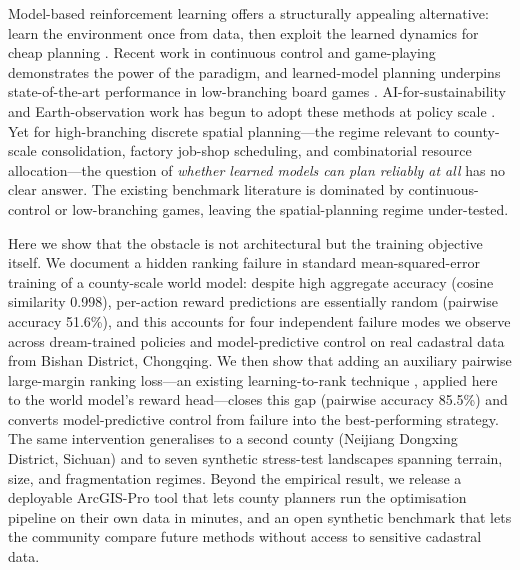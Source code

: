 \documentclass[11pt]{article}
\begin{document}
Model-based reinforcement learning offers a structurally appealing alternative: learn the environment once from data, then exploit the learned dynamics for cheap planning \citep{chua2018deep,janner2019trust,nagabandi2018neural,kurutach2018model}. Recent work in continuous control \citep{hafner2025dreamerv3,hansen2024tdmpc2,hafner2019learning} and game-playing \citep{mnih2015human,silver2017mastering,vinyals2019grandmaster,wurman2022outracing} demonstrates the power of the paradigm, and learned-model planning underpins state-of-the-art performance in low-branching board games \citep{schrittwieser2020muzero}. AI-for-sustainability and Earth-observation work has begun to adopt these methods at policy scale \citep{rolnick2022tackling,reichstein2019deep,tuia2024artificial}. Yet for high-branching discrete spatial planning---the regime relevant to county-scale consolidation, factory job-shop scheduling, and combinatorial resource allocation---the question of \emph{whether learned models can plan reliably at all} has no clear answer. The existing benchmark literature is dominated by continuous-control or low-branching games, leaving the spatial-planning regime under-tested.

Here we show that the obstacle is not architectural but the training objective itself. We document a hidden ranking failure in standard mean-squared-error training of a county-scale world model: despite high aggregate accuracy (cosine similarity 0.998), per-action reward predictions are essentially random (pairwise accuracy 51.6\%), and this accounts for four independent failure modes we observe across dream-trained policies and model-predictive control on real cadastral data from Bishan District, Chongqing. We then show that adding an auxiliary pairwise large-margin ranking loss---an existing learning-to-rank technique \citep{burges2005learning,joachims2002optimizing,herbrich2000large}, applied here to the world model's reward head---closes this gap (pairwise accuracy 85.5\%) and converts model-predictive control from failure into the best-performing strategy. The same intervention generalises to a second county (Neijiang Dongxing District, Sichuan) and to seven synthetic stress-test landscapes spanning terrain, size, and fragmentation regimes. Beyond the empirical result, we release a deployable ArcGIS-Pro tool that lets county planners run the optimisation pipeline on their own data in minutes, and an open synthetic benchmark that lets the community compare future methods without access to sensitive cadastral data.
\end{document}
